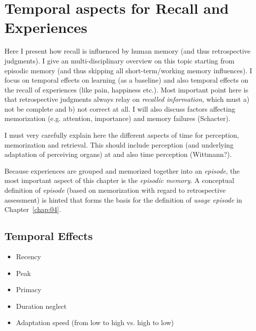 \chapter{Temporal aspects for Recall and Experiences}\label{chap:03}
\begin{chapter-abstract}
Here I present how recall is influenced by human memory (and thus retrospective judgments).
I give an multi-disciplinary overview on this topic starting from episodic memory (and thus skipping all short-term/working memory influences).
I focus on temporal effects on learning (as a baseline) and also temporal effects on the recall of experiences (like pain, happiness etc.).
Most important point here is that retrospective judgments always relay on \textit{recalled information}, which must a) not be complete and b) not correct at all.
I will also discuss factors affecting memorization (e.g. attention, importance) and memory failures (Schacter).

I must very carefully explain here the different aspects of time for perception, memorization and retrieval.
This should include perception (and underlying adaptation of perceiving organs) at and also time perception (Wittmann?).


Because experiences are grouped and memorized together into an \textit{episode}, the most important aspect of this chapter is the \textit{episodic memory}.
A conceptual definition of \emph{episode} (based on memorization with regard to retrospective assessment) is hinted that forms the basis for the definition of \textit{usage episode} in Chapter~\ref{chap:04}.
\end{chapter-abstract}

\section{Temporal Effects}
\begin{itemize}
\item Recency
\item Peak
\item Primacy
\item Duration neglect
\item Adaptation speed (from low to high vs. high to low)
\end{itemize}




